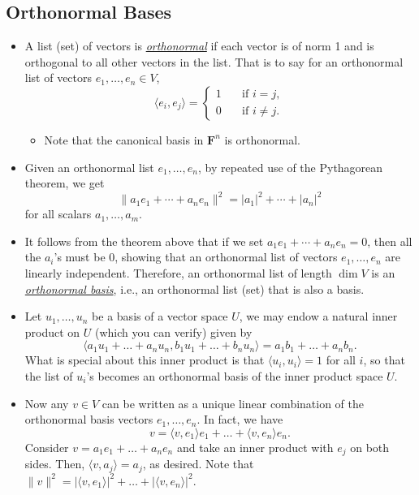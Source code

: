 \documentclass[11pt]{article}
\newcommand{\df}[1]{\ul{\textit{\textsf{#1}}}}
\newcommand{\F}{\mathbf{F}}
\renewcommand{\d}{\dim}
\newcommand{\inp}[2]{\langle #1, #2 \rangle}
\newcommand{\nm}[1]{\|#1\|}
\newcommand{\abs}[1]{\lvert #1 \rvert}
\begin{document}
\subsection{Orthonormal Bases}
\begin{itemize}
    \item A list (set) of vectors is \df{orthonormal} if each vector is of norm 1 and is orthogonal to all other vectors in the list. That is to say for an orthonormal list of vectors $e_1,\dots,e_n \in V$,
    \begin{equation*}
    \inp{e_i}{e_j} = 
        \left\{
            \begin{array}{rl}
                1 \quad & \text{if } i = j, \\
                0 \quad & \text{if } i \not= j.
            \end{array}
        \right.
    \end{equation*}
    \begin{itemize}
        \item Note that the canonical basis in $\F^n$ is orthonormal.
    \end{itemize}
    \item Given an orthonormal list $e_1,\dots,e_n$, by repeated use of the Pythagorean theorem, we get $$\nm{a_1 e_1 + \cdots + a_n e_n}^2 = \abs{a_1}^2 + \cdots +\abs{a_n}^2$$ for all scalars $a_1, \dots, a_m$.
    \item It follows from the theorem above that if we set $a_1 e_1 + \cdots + a_n e_n = 0$, then all the $a_i$'s must be 0, showing that an orthonormal list of vectors $e_1,\dots,e_n$ are linearly independent. Therefore, an orthonormal list of length $\d V$ is an \df{orthonormal basis}, i.e., an orthonormal list (set) that is also a basis.
    \item Let $u_1,\dots,u_n$ be a basis of a vector space $U$, we may endow a natural inner product on $U$ (which you can verify) given by $$\inp{a_1u_1+\dots+a_nu_n}{b_1u_1+\dots+b_nu_n}=a_1b_1+\dots+a_nb_n.$$ What is special about this inner product is that $\inp{u_i}{u_i} = 1$ for all $i$, so that the list of $u_i$'s becomes an orthonormal basis of the inner product space $U$.
    \item Now any $v \in V$ can be written as a unique linear combination of the orthonormal basis vectors $e_1,\dots,e_n$. In fact, we have $$v = \inp{v}{e_1}e_1 + \dots + \inp{v}{e_n}e_n.$$
    Consider $v = a_1 e_1 + \dots + a_n e_n$ and take an inner product with $e_j$ on both sides. Then, $\inp{v}{a_j} = a_j$, as desired. Note that $\nm{v}^2 = \abs{\inp{v}{e_1}}^2 + \dots + \abs{\inp{v}{e_n}}^2$.

\end{itemize}
\end{document}
